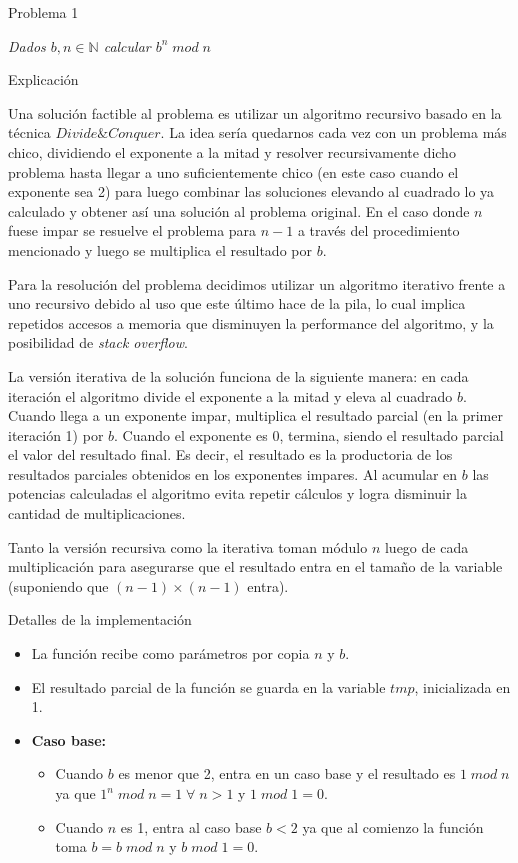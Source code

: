 \begin{section}{Problema 1}

	\textit{Dados $b,n \in \mathbb{N} $ calcular $b^n\; mod\; n$}

	\begin{subsection}{Explicación}

		Una solución factible al problema es utilizar un algoritmo recursivo basado en la técnica $Divide \& Conquer$. La idea sería quedarnos cada vez con un problema más chico, dividiendo el exponente a la mitad y resolver recursivamente dicho problema hasta llegar a uno suficientemente chico (en este caso cuando el exponente sea 2) para luego combinar las soluciones elevando al cuadrado lo ya calculado y obtener así una solución al problema original. En el caso donde $n$ fuese impar se resuelve el problema para $n-1$ a través del procedimiento mencionado y luego se multiplica el resultado por $b$.

		Para la resolución del problema decidimos utilizar un algoritmo iterativo frente a uno recursivo debido al uso que este último hace de la pila, lo cual implica repetidos accesos a memoria que disminuyen la performance del algoritmo, y la posibilidad de {\em stack overflow}.

		La versión iterativa de la solución funciona de la siguiente manera: en cada iteración el algoritmo divide el exponente a la mitad y eleva al cuadrado $b$. Cuando llega a un exponente impar, multiplica el resultado parcial (en la primer iteración 1) por $b$. Cuando el exponente es 0, termina, siendo el resultado parcial el valor del resultado final. Es decir, el resultado es la productoria de los resultados parciales obtenidos en los exponentes impares. Al acumular en $b$ las potencias calculadas el algoritmo evita repetir cálculos y logra disminuir la cantidad de multiplicaciones.

		Tanto la versión recursiva como la iterativa toman módulo $n$ luego de cada multiplicación para asegurarse que el resultado entra en el tamaño de la variable (suponiendo que $(n-1)\times (n-1)$ entra).
	\end{subsection}
	
	\begin{subsection}{Detalles de la implementación}

		\begin{itemize}
			\item La función recibe como parámetros por copia $n$ y $b$.
			\item El resultado parcial de la función se guarda en la variable $tmp$, inicializada en 1.
			\item \textbf{Caso base:} 
			\begin{itemize}
				\item Cuando $b$ es menor que 2, entra en un caso base y el resultado es $1\;mod\;n$ ya que 
				$1^n\;mod\;n = 1\;\forall\;n>1$ y $1\;mod\;1 = 0$.
				\item Cuando $n$ es 1, entra al caso base $b<2$ ya que al comienzo la función toma $b=b\;mod\; n$ y $b\; mod\; 1 = 0$.
			\end{itemize}


\end{itemize}
\end{subsection}
\end{section}
